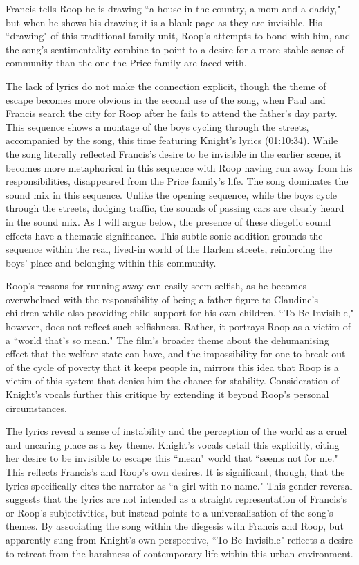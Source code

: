 Francis tells Roop he is drawing ``a house in the country, a mom and a daddy," but when he shows his drawing it is a blank page as they are invisible.
His ``drawing" of this traditional family unit, Roop's attempts to bond with him, and the song's sentimentality combine to point to a desire for a more stable sense of community than the one the Price family are faced with.

The lack of lyrics do not make the connection explicit, though the theme of escape becomes more obvious in the second use of the song, when Paul and Francis search the city for Roop after he fails to attend the father's day party.
This sequence shows a montage of the boys cycling through the streets, accompanied by the song, this time featuring Knight's lyrics (01:10:34).
While the song literally reflected Francis's desire to be invisible in the earlier scene, it becomes more metaphorical in this sequence with Roop having run away from his responsibilities, disappeared from the Price family's life.
The song dominates the sound mix in this sequence.
Unlike the opening sequence, while the boys cycle through the streets, dodging traffic, the sounds of passing cars are clearly heard in the sound mix.
As I will argue below, the presence of these diegetic sound effects have a thematic significance.
This subtle sonic addition grounds the sequence within the real, lived-in world of the Harlem streets, reinforcing the boys' place and belonging within this community.

Roop's reasons for running away can easily seem selfish, as he becomes overwhelmed with the responsibility of being a father figure to Claudine's children while also providing child support for his own children.
``To Be Invisible," however, does not reflect such selfishness.
Rather, it portrays Roop as a victim of a ``world that's so mean."
The film's broader theme about the dehumanising effect that the welfare state can have, and the impossibility for one to break out of the cycle of poverty that it keeps people in, mirrors this idea that Roop is a victim of this system that denies him the chance for stability.
Consideration of Knight's vocals further this critique by extending it beyond Roop's personal circumstances.

The lyrics reveal a sense of instability and the perception of the world as a cruel and uncaring place as a key theme.
Knight's vocals detail this explicitly, citing her desire to be invisible to escape this ``mean" world that ``seems not for me."
This reflects Francis's and Roop's own desires.
It is significant, though, that the lyrics specifically cites the narrator as ``a girl with no name."
This gender reversal suggests that the lyrics are not intended as a straight representation of Francis's or Roop's subjectivities, but instead points to a universalisation of the song's themes.
By associating the song within the diegesis with Francis and Roop, but apparently sung from Knight's own perspective, ``To Be Invisible" reflects a desire to retreat from the harshness of contemporary life within this urban environment.


